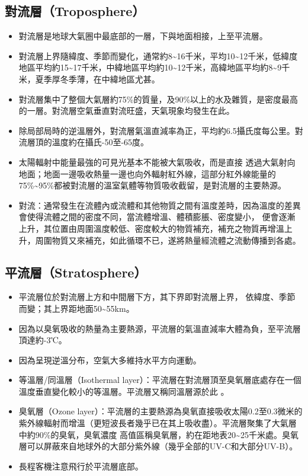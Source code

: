 \documentclass[a4paper,12pt]{report}
\begin{document}
\subsection{對流層（Troposphere）}
\begin{itemize}
  \item 對流層是地球大氣圈中最底部的一層，下與地面相接，上至平流層。
  \item 對流層上界隨緯度、季節而變化，通常約8\sim 16千米，平均10\sim 12千米，低緯度地區平均約15\sim 17千米，中緯地區平均約10\sim 12千米，高緯地區平均約8\sim 9千米，夏季厚冬季薄，在中緯地區尤甚。
  \item 對流層集中了整個大氣層約75\%的質量，及90\%以上的水及雜質，是密度最高的一層。對流層空氣垂直對流旺盛，天氣現象均發生在此。
  \item 除局部局時的逆溫層外，對流層氣溫直減率為正，平均約6.5攝氏度每公里。對流層頂的溫度約在攝氏-50至-65度。
  \item 太陽輻射中能量最強的可見光基本不能被大氣吸收，而是直接 透過大氣射向地面；地面一邊吸收熱量一邊也向外輻射紅外線，這部分紅外線能量的75\%\sim 95\%都被對流層的溫室氣體等物質吸收截留，是對流層的主要熱源。
  \item 對流：通常發生在流體內或流體和其他物質之間有溫度差時，因為溫度的差異會使得流體之間的密度不同，當流體增溫、體積膨脹、密度變小， 便會逐漸上升，其位置由周圍溫度較低、密度較大的物質補充，補充之物質再增溫上升，周圍物質又來補充，如此循環不已，遂將熱量經流體之流動傳播到各處。
\end{itemize}
\subsection{平流層（Stratosphere）}
\begin{itemize}
  \item 平流層位於對流層上方和中間層下方，其下界即對流層上界， 依緯度、季節而變；其上界距地面50\sim 55km。
  \item 因為以臭氧吸收的熱量為主要熱源，平流層的氣溫直減率大體為負，至平流層頂達約-3℃。
  \item 因為呈現逆溫分布，空氣大多維持水平方向運動。
  \item 等溫層/同溫層（Isothermal layer）：平流層在對流層頂至臭氧層底處存在一個溫度垂直變化較小的等溫層。平流層又稱同溫層源於此 。
  \item 臭氧層（Ozone layer）：平流層的主要熱源為臭氧直接吸收太陽0.2至0.3微米的紫外線輻射而增溫（更短波長者幾乎已在其上吸收盡）。平流層聚集了大氣層中約90\%的臭氧，臭氧濃度 高值區稱臭氧層，約在距地表20\sim 25千米處。臭氧層可以屏蔽來自地球外的大部分紫外線（幾乎全部的UV-C和大部分UV-B）。
  \item 長程客機注意飛行於平流層底部。
\end{itemize}
\end{document}
